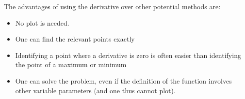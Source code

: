 \bigskip


The advantages of using the derivative over other potential methods are:
\begin{itemize}
\item No plot is needed.
\item One can find the relevant points exactly
\item Identifying a point where a derivative is zero is often easier than
identifying the point of a maximum or minimum
\item One can solve the problem, even if the definition of the function
involves other variable parameters (and one thus cannot plot).
\end{itemize}

